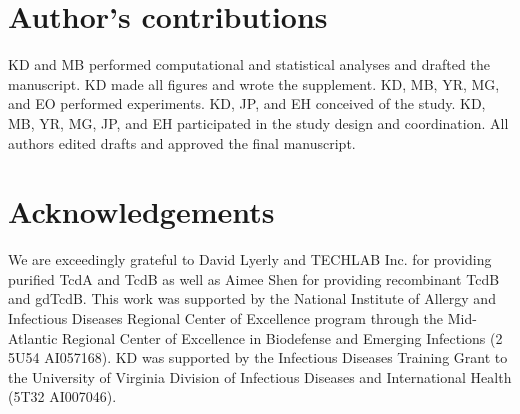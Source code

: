 \section{Author's contributions}
KD and MB performed computational and statistical analyses 
and drafted the manuscript. KD made all figures and 
wrote the supplement. KD, MB, YR, MG, and EO performed 
experiments. KD, JP, and EH conceived of the study. KD, 
MB, YR, MG, JP, and EH participated in the study design 
and coordination. All authors edited drafts and approved 
the final manuscript.

\section{Acknowledgements}
We are exceedingly grateful to David Lyerly and 
TECHLAB Inc. for providing purified TcdA and TcdB 
as well as Aimee Shen for providing recombinant TcdB 
and gdTcdB. This work was supported by the National 
Institute of Allergy and Infectious Diseases Regional 
Center of Excellence program through the Mid-Atlantic 
Regional Center of Excellence in Biodefense and Emerging 
Infections (2 5U54 AI057168). KD was supported by the 
Infectious Diseases Training Grant to the University 
of Virginia Division of Infectious Diseases and 
International Health (5T32 AI007046).




